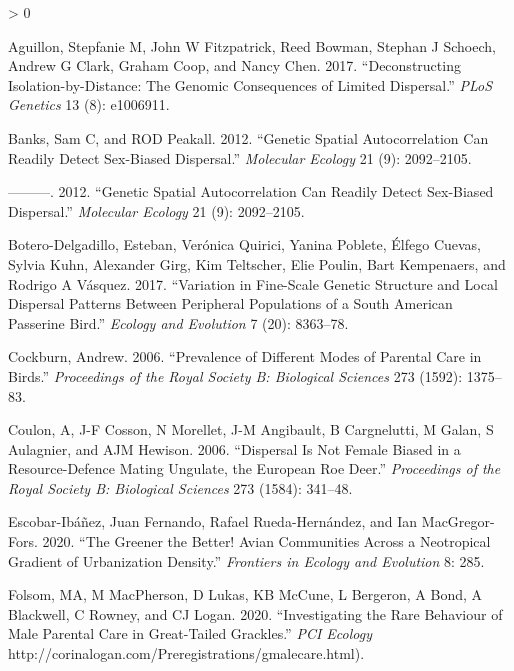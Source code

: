 \documentclass[
]{article}
\newlength{\cslhangindent}
\newenvironment{CSLReferences}[2] %
 {%
  \setlength{\parindent}{0pt}
  \ifodd #1 \everypar{\setlength{\hangindent}{\cslhangindent}}\ignorespaces\fi
  \ifnum #2 > 0
  \setlength{\parskip}{#2\baselineskip}
  \fi
 }%
 {}
\begin{document}
\hypertarget{refs}{}
\begin{CSLReferences}{1}{0}
\leavevmode\hypertarget{ref-aguillon2017deconstructing}{}%
Aguillon, Stepfanie M, John W Fitzpatrick, Reed Bowman, Stephan J
Schoech, Andrew G Clark, Graham Coop, and Nancy Chen. 2017.
{``Deconstructing Isolation-by-Distance: The Genomic Consequences of
Limited Dispersal.''} \emph{PLoS Genetics} 13 (8): e1006911.

\leavevmode\hypertarget{ref-banks2012genetic}{}%
Banks, Sam C, and ROD Peakall. 2012. {``Genetic Spatial Autocorrelation
Can Readily Detect Sex-Biased Dispersal.''} \emph{Molecular Ecology} 21
(9): 2092--2105.

\leavevmode\hypertarget{ref-banks2012genetic}{}%
---------. 2012. {``Genetic Spatial Autocorrelation Can Readily Detect
Sex-Biased Dispersal.''} \emph{Molecular Ecology} 21 (9): 2092--2105.

\leavevmode\hypertarget{ref-botero2017variation}{}%
Botero-Delgadillo, Esteban, Verónica Quirici, Yanina Poblete, Élfego
Cuevas, Sylvia Kuhn, Alexander Girg, Kim Teltscher, Elie Poulin, Bart
Kempenaers, and Rodrigo A Vásquez. 2017. {``Variation in Fine-Scale
Genetic Structure and Local Dispersal Patterns Between Peripheral
Populations of a South American Passerine Bird.''} \emph{Ecology and
Evolution} 7 (20): 8363--78.

\leavevmode\hypertarget{ref-cockburn2006prevalence}{}%
Cockburn, Andrew. 2006. {``Prevalence of Different Modes of Parental
Care in Birds.''} \emph{Proceedings of the Royal Society B: Biological
Sciences} 273 (1592): 1375--83.

\leavevmode\hypertarget{ref-coulon2006dispersal}{}%
Coulon, A, J-F Cosson, N Morellet, J-M Angibault, B Cargnelutti, M
Galan, S Aulagnier, and AJM Hewison. 2006. {``Dispersal Is Not Female
Biased in a Resource-Defence Mating Ungulate, the European Roe Deer.''}
\emph{Proceedings of the Royal Society B: Biological Sciences} 273
(1584): 341--48.

\leavevmode\hypertarget{ref-escobar2020greener}{}%
Escobar-Ibáñez, Juan Fernando, Rafael Rueda-Hernández, and Ian
MacGregor-Fors. 2020. {``The Greener the Better! Avian Communities
Across a Neotropical Gradient of Urbanization Density.''}
\emph{Frontiers in Ecology and Evolution} 8: 285.

\leavevmode\hypertarget{ref-Folsom2020malecare}{}%
Folsom, MA, M MacPherson, D Lukas, KB McCune, L Bergeron, A Bond, A
Blackwell, C Rowney, and CJ Logan. 2020. {``Investigating the Rare
Behaviour of Male Parental Care in Great-Tailed Grackles.''} \emph{PCI
Ecology} http://corinalogan.com/Preregistrations/gmalecare.html).


\end{CSLReferences}
\end{document}
